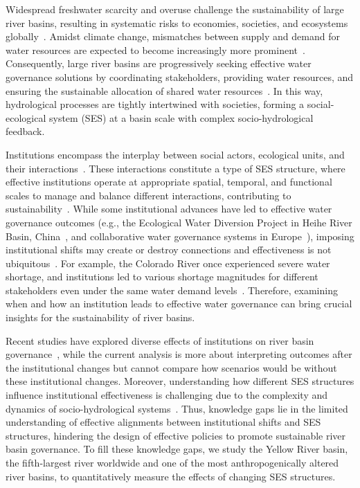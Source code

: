 Widespread freshwater scarcity and overuse challenge the sustainability of large river basins, resulting in systematic risks to economies, societies, and ecosystems globally~\cite{distefano2017, dolan2021, xu2020b, mekonnen2016}.
Amidst climate change, mismatches between supply and demand for water resources are expected to become increasingly more prominent~\cite{florke2018, yoon2021}.
Consequently, large river basins are progressively seeking effective water governance solutions by coordinating stakeholders, providing water resources, and ensuring the sustainable allocation of shared water resources~\cite{wang2019d}.
In this way, hydrological processes are tightly intertwined with societies, forming a social-ecological system (SES) at a basin scale with complex socio-hydrological feedback.

Institutions encompass the interplay between social actors, ecological units, and their interactions~\cite{young2008, lien2020, bodin2017b, wang2022g}.
These interactions constitute a type of SES structure, where effective institutions operate at appropriate spatial, temporal, and functional scales to manage and balance different interactions, contributing to sustainability~\cite{epstein2015, wang2019d}.
While some institutional advances have led to effective water governance outcomes (e.g., the Ecological Water Diversion Project in Heihe River Basin, China~\cite{wang2019d}, and collaborative water governance systems in Europe~\cite{green2013}), imposing institutional shifts may create or destroy connections and effectiveness is not ubiquitous~\cite{loos2022}.
For example, the Colorado River once experienced severe water shortage, and institutions led to various shortage magnitudes for different stakeholders even under the same water demand levels~\cite{hadjimichael2020}.
Therefore, examining when and how an institution leads to effective water governance can bring crucial insights for the sustainability of river basins.

Recent studies have explored diverse effects of institutions on river basin governance~\cite{bouckaert2022, vallury2022, loch2020, kirchhoff2016}, while the current analysis is more about interpreting outcomes after the institutional changes but cannot compare how scenarios would be without these institutional changes.
Moreover, understanding how different SES structures influence institutional effectiveness is challenging due to the complexity and dynamics of socio-hydrological systems~\cite{bodin2017b}.
Thus, knowledge gaps lie in the limited understanding of effective alignments between institutional shifts and SES structures, hindering the design of effective policies to promote sustainable river basin governance.
To fill these knowledge gaps, we study the Yellow River basin, the fifth-largest river worldwide and one of the most anthropogenically altered river basins, to quantitatively measure the effects of changing SES structures.

